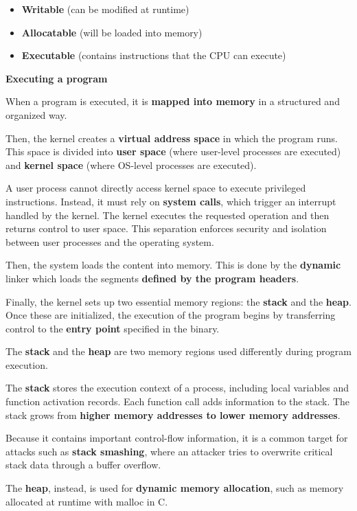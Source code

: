 \documentclass{article}
\begin{document}
\begin{itemize}
\item \textbf{Writable} (can be modified at runtime)
\item \textbf{Allocatable} (will be loaded into memory)
\item \textbf{Executable} (contains instructions that the CPU can execute)
\end{itemize}

\textbf{Executing a program}

When a program is executed, it is \textbf{mapped into memory} in a structured and organized way.

Then, the kernel creates a \textbf{virtual address space} in which the program runs. This space is divided into \textbf{user space} (where user-level processes are executed) and \textbf{kernel space} (where OS-level processes are executed).

A user process cannot directly access kernel space to execute privileged instructions. Instead, it must rely on \textbf{system calls}, which trigger an interrupt handled by the kernel. The kernel executes the requested operation and then returns control to user space. This separation enforces security and isolation between user processes and the operating system.

Then, the system loads the content into memory. This is done by the \textbf{dynamic} linker which loads the segments \textbf{defined by the program headers}.

Finally, the kernel sets up two essential memory regions: the \textbf{stack} and the \textbf{heap}. Once these are initialized, the execution of the program begins by transferring control to the \textbf{entry point} specified in the binary.

The \textbf{stack} and the \textbf{heap} are two memory regions used differently during program execution.

The \textbf{stack} stores the execution context of a process, including local variables and function activation records. Each function call adds information to the stack. The stack grows from \textbf{higher memory addresses to lower memory addresses}.

Because it contains important control-flow information, it is a common target for attacks such as \textbf{stack smashing}, where an attacker tries to overwrite critical stack data through a buffer overflow.

The \textbf{heap}, instead, is used for \textbf{dynamic memory allocation}, such as memory allocated at runtime with malloc in C.
\end{document}
